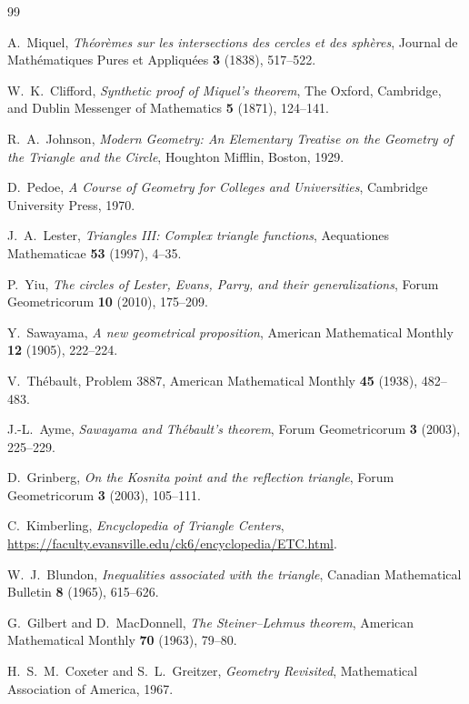 \documentclass[11pt]{article}
\theoremstyle{definition}
\theoremstyle{remark}
\begin{document}
\begin{thebibliography}{99}

A.~Miquel,
\emph{Th\'eor\`emes sur les intersections des cercles et des sph\`eres},
Journal de Math\'ematiques Pures et Appliqu\'ees \textbf{3} (1838), 517--522.

W.~K.~Clifford,
\emph{Synthetic proof of Miquel's theorem},
The Oxford, Cambridge, and Dublin Messenger of Mathematics \textbf{5} (1871), 124--141.

R.~A.~Johnson,
\emph{Modern Geometry: An Elementary Treatise on the Geometry of the Triangle and the Circle},
Houghton Mifflin, Boston, 1929.

D.~Pedoe,
\emph{A Course of Geometry for Colleges and Universities},
Cambridge University Press, 1970.

J.~A.~Lester,
\emph{Triangles III: Complex triangle functions},
Aequationes Mathematicae \textbf{53} (1997), 4--35.

P.~Yiu,
\emph{The circles of Lester, Evans, Parry, and their generalizations},
Forum Geometricorum \textbf{10} (2010), 175--209.

Y.~Sawayama,
\emph{A new geometrical proposition},
American Mathematical Monthly \textbf{12} (1905), 222--224.

V.~Th\'ebault,
Problem 3887,
American Mathematical Monthly \textbf{45} (1938), 482--483.

J.-L.~Ayme,
\emph{Sawayama and Th\'ebault's theorem},
Forum Geometricorum \textbf{3} (2003), 225--229.

D.~Grinberg,
\emph{On the Kosnita point and the reflection triangle},
Forum Geometricorum \textbf{3} (2003), 105--111.

C.~Kimberling,
\emph{Encyclopedia of Triangle Centers},
\url{https://faculty.evansville.edu/ck6/encyclopedia/ETC.html}.

W.~J.~Blundon,
\emph{Inequalities associated with the triangle},
Canadian Mathematical Bulletin \textbf{8} (1965), 615--626.

G.~Gilbert and D.~MacDonnell,
\emph{The Steiner--Lehmus theorem},
American Mathematical Monthly \textbf{70} (1963), 79--80.

H.~S.~M.~Coxeter and S.~L.~Greitzer,
\emph{Geometry Revisited},
Mathematical Association of America, 1967.


\end{thebibliography}
\end{document}
